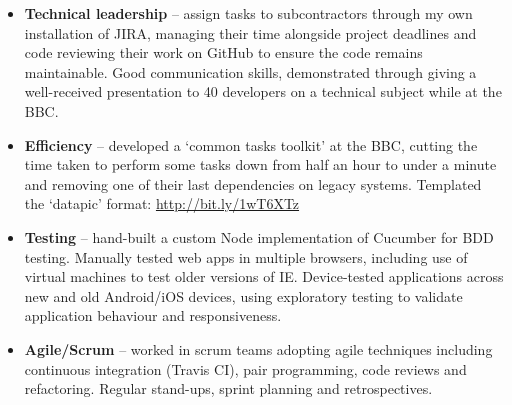\documentclass[class=article, crop=false]{standalone}
\begin{document}
\begin{itemize}
    \item \textbf{Technical leadership} – assign tasks to subcontractors through my own installation of JIRA, managing their time alongside project deadlines and code reviewing their work on GitHub to ensure the code remains maintainable. Good communication skills, demonstrated through giving a well-received presentation to 40 developers on a technical subject while at the BBC.

    \item \textbf{Efficiency} – developed a ‘common tasks toolkit’ at the BBC, cutting the time taken to perform some tasks down from half an hour to under a minute and removing one of their last dependencies on legacy systems. Templated the ‘datapic’ format: \url{http://bit.ly/1wT6XTz}

    \item \textbf{Testing} – hand-built a custom Node implementation of Cucumber for BDD testing. Manually tested web apps in multiple browsers, including use of virtual machines to test older versions of IE. Device-tested applications across new and old Android/iOS devices, using exploratory testing to validate application behaviour and responsiveness.

    \item \textbf{Agile/Scrum} – worked in scrum teams adopting agile techniques including continuous integration (Travis CI), pair programming, code reviews and refactoring. Regular stand-ups, sprint planning and retrospectives.

\end{itemize}
\end{document}
